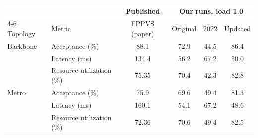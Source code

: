 \begin{tabular}{llcccc}
\toprule
 & & Published & \multicolumn{3}{c}{Our runs, load 1.0} \\
\cmidrule(lr){4-6}
Topology & Metric & FPPVS (paper) & Original & 2022 & Updated \\
\midrule
Backbone & Acceptance (\%) & 88.1 & 72.9 & 44.5 & 86.4 \\
 & Latency (ms) & 134.4 & 56.2 & 67.2 & 50.0 \\
 & Resource utilization (\%) & 75.35 & 70.4 & 42.3 & 82.8 \\
\midrule
Metro & Acceptance (\%) & 75.9 & 69.6 & 49.4 & 81.3 \\
 & Latency (ms) & 160.1 & 54.1 & 67.2 & 48.6 \\
 & Resource utilization (\%) & 72.36 & 70.6 & 49.4 & 82.5 \\
\bottomrule
\end{tabular}